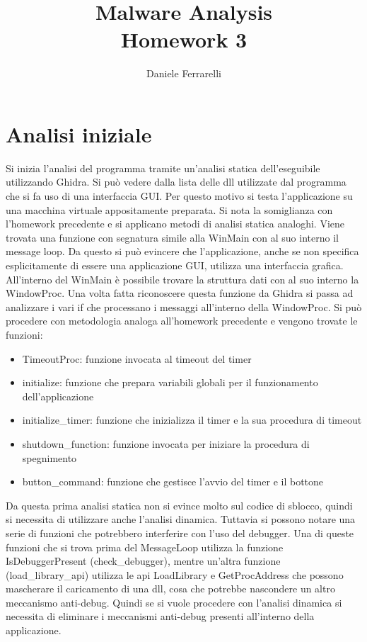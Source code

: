 \documentclass[a4paper,12pt]{article}
\title{Malware Analysis \\ \large Homework 3}
\author{Daniele Ferrarelli}
\date{}
\begin{document}
\maketitle

\section{Analisi iniziale}
Si inizia l'analisi del programma tramite un'analisi statica dell'eseguibile utilizzando Ghidra. Si può vedere dalla lista delle dll utilizzate dal programma che si fa uso di una interfaccia GUI. Per questo motivo si testa l'applicazione su una macchina virtuale appositamente preparata. Si nota la somiglianza con l'homework precedente e si applicano metodi di analisi statica analoghi. Viene trovata una funzione con segnatura simile alla WinMain con al suo interno il message loop. Da questo si può evincere che l'applicazione, anche se non specifica esplicitamente di essere una applicazione GUI, utilizza una interfaccia grafica. All'interno del WinMain è possibile trovare la struttura dati con al suo interno la WindowProc. Una volta fatta riconoscere questa funzione da Ghidra si passa ad analizzare i vari if che processano i messaggi all'interno della WindowProc. Si può procedere con metodologia analoga all'homework precedente e vengono trovate le funzioni:
\begin{itemize}
\item TimeoutProc: funzione invocata al timeout del timer
\item initialize: funzione che prepara variabili globali per il funzionamento dell'applicazione
\item initialize\_timer: funzione che inizializza il timer e la sua procedura di timeout
\item shutdown\_function: funzione invocata per iniziare la procedura di spegnimento
\item button\_command: funzione che gestisce l'avvio del timer e il bottone
\end{itemize}
Da questa prima analisi statica non si evince molto sul codice di sblocco, quindi si necessita di utilizzare anche l'analisi dinamica. Tuttavia si possono notare una serie di funzioni che potrebbero interferire con l'uso del debugger. Una di queste funzioni che si trova prima del MessageLoop utilizza la funzione IsDebuggerPresent (check\_debugger), mentre un'altra funzione (load\_library\_api) utilizza le api LoadLibrary e GetProcAddress che possono mascherare il caricamento di una dll, cosa che potrebbe nascondere un altro meccanismo anti-debug. Quindi se si vuole procedere con l'analisi dinamica si necessita di eliminare i meccanismi anti-debug presenti all'interno della applicazione. 
\end{document}
